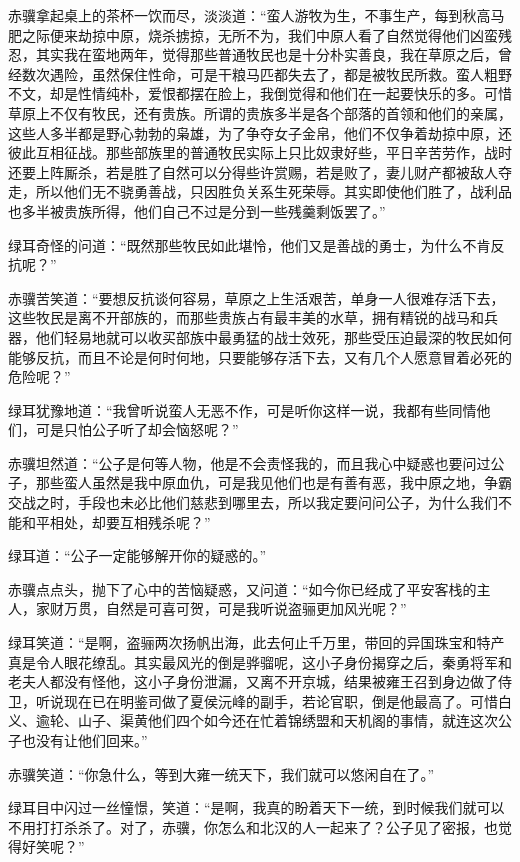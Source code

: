 赤骥拿起桌上的茶杯一饮而尽，淡淡道：“蛮人游牧为生，不事生产，每到秋高马肥之际便来劫掠中原，烧杀掳掠，无所不为，我们中原人看了自然觉得他们凶蛮残忍，其实我在蛮地两年，觉得那些普通牧民也是十分朴实善良，我在草原之后，曾经数次遇险，虽然保住性命，可是干粮马匹都失去了，都是被牧民所救。蛮人粗野不文，却是性情纯朴，爱恨都摆在脸上，我倒觉得和他们在一起要快乐的多。可惜草原上不仅有牧民，还有贵族。所谓的贵族多半是各个部落的首领和他们的亲属，这些人多半都是野心勃勃的枭雄，为了争夺女子金帛，他们不仅争着劫掠中原，还彼此互相征战。那些部族里的普通牧民实际上只比奴隶好些，平日辛苦劳作，战时还要上阵厮杀，若是胜了自然可以分得些许赏赐，若是败了，妻儿财产都被敌人夺走，所以他们无不骁勇善战，只因胜负关系生死荣辱。其实即使他们胜了，战利品也多半被贵族所得，他们自己不过是分到一些残羹剩饭罢了。”

绿耳奇怪的问道：“既然那些牧民如此堪怜，他们又是善战的勇士，为什么不肯反抗呢？”

赤骥苦笑道：“要想反抗谈何容易，草原之上生活艰苦，单身一人很难存活下去，这些牧民是离不开部族的，而那些贵族占有最丰美的水草，拥有精锐的战马和兵器，他们轻易地就可以收买部族中最勇猛的战士效死，那些受压迫最深的牧民如何能够反抗，而且不论是何时何地，只要能够存活下去，又有几个人愿意冒着必死的危险呢？”

绿耳犹豫地道：“我曾听说蛮人无恶不作，可是听你这样一说，我都有些同情他们，可是只怕公子听了却会恼怒呢？”

赤骥坦然道：“公子是何等人物，他是不会责怪我的，而且我心中疑惑也要问过公子，那些蛮人虽然是我中原血仇，可是我见他们也是有善有恶，我中原之地，争霸交战之时，手段也未必比他们慈悲到哪里去，所以我定要问问公子，为什么我们不能和平相处，却要互相残杀呢？”

绿耳道：“公子一定能够解开你的疑惑的。”

赤骥点点头，抛下了心中的苦恼疑惑，又问道：“如今你已经成了平安客栈的主人，家财万贯，自然是可喜可贺，可是我听说盗骊更加风光呢？”

绿耳笑道：“是啊，盗骊两次扬帆出海，此去何止千万里，带回的异国珠宝和特产真是令人眼花缭乱。其实最风光的倒是骅骝呢，这小子身份揭穿之后，秦勇将军和老夫人都没有怪他，这小子身份泄漏，又离不开京城，结果被雍王召到身边做了侍卫，听说现在已在明鉴司做了夏侯沅峰的副手，若论官职，倒是他最高了。可惜白义、逾轮、山子、渠黄他们四个如今还在忙着锦绣盟和天机阁的事情，就连这次公子也没有让他们回来。”

赤骥笑道：“你急什么，等到大雍一统天下，我们就可以悠闲自在了。”

绿耳目中闪过一丝憧憬，笑道：“是啊，我真的盼着天下一统，到时候我们就可以不用打打杀杀了。对了，赤骥，你怎么和北汉的人一起来了？公子见了密报，也觉得好笑呢？”

